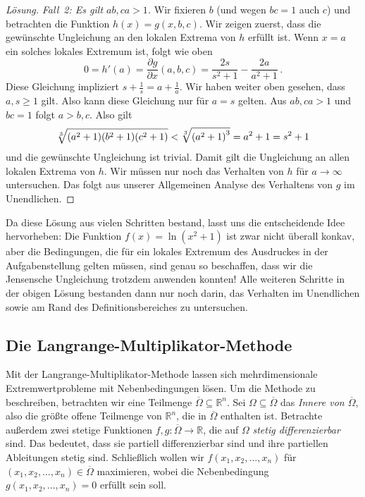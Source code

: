 \begin{proof}[Lösung]
	\emph{Fall~2: Es gilt $ab,ca>1$.} Wir fixieren $b$ (und wegen $bc=1$ auch $c$) und betrachten die Funktion $h(x)=g(x,b,c)$. Wir zeigen zuerst, dass die gewünschte Ungleichung an den lokalen Extrema von $h$ erfüllt ist. Wenn $x=a$ ein solches lokales Extremum ist, folgt wie oben
	\begin{equation*}
		0=h'(a)=\frac{\partial g}{\partial x}(a,b,c)=\frac{2s}{s^2+1}-\frac{2a}{a^2+1}\,.
	\end{equation*}
	Diese Gleichung impliziert $s+\frac1s=a+\frac1a$. Wir haben weiter oben gesehen, dass $a,s\geqslant 1$ gilt. Also kann diese Gleichung nur für $a=s$ gelten. Aus $ab,ca>1$ und $bc=1$ folgt $a>b,c$. Also gilt
	\begin{equation*}
		\sqrt[3]{\parens*{a^2+1}\parens*{b^2+1}\parens*{c^2+1}}<\sqrt[3]{\parens*{a^2+1}^3}=a^2+1=s^2+1
	\end{equation*}
	und die gewünschte Ungleichung ist trivial. Damit gilt die Ungleichung an allen lokalen Extrema von $h$. Wir müssen nur noch das Verhalten von $h$ für $a\rightarrow \infty$ untersuchen. Das folgt aus unserer Allgemeinen Analyse des Verhaltens von $g$ im Unendlichen.
\end{proof}

Da diese Lösung aus vielen Schritten bestand, lasst uns die entscheidende Idee hervorheben: Die Funktion $f(x)=\ln(x^2+1)$ ist zwar nicht überall konkav, aber die Bedingungen, die für ein lokales Extremum des Ausdruckes in der Aufgabenstellung gelten müssen, sind genau so beschaffen, dass wir die Jensensche Ungleichung trotzdem anwenden konnten! Alle weiteren Schritte in der obigen Lösung bestanden dann nur noch darin, das Verhalten im Unendlichen sowie am Rand des Definitionsbereiches zu untersuchen.

\subsection*{Die Langrange-Multiplikator-Methode}
Mit der Langrange-Multiplikator-Methode lassen sich mehrdimensionale Extremwertprobleme mit Nebenbedingungen lösen. Um die Methode zu beschreiben, betrachten wir eine Teilmenge $\overline{\Omega}\subseteq \mathbb R^n$. Sei $\Omega\subseteq \overline{\Omega}$ das \emph{Innere von $\overline{\Omega}$}, also die größte offene Teilmenge von $\mathbb R^n$, die in $\overline{\Omega}$ enthalten ist. Betrachte außerdem zwei stetige Funktionen $f,g\colon \overline{\Omega}\rightarrow \mathbb R$, die auf $\Omega$ \emph{stetig differenzierbar} sind. Das bedeutet, dass sie partiell differenzierbar sind und ihre partiellen Ableitungen stetig sind. Schließlich wollen wir $f(x_1,x_2,\dotsc,x_n)$ für $(x_1,x_2,\dotsc,x_n)\in\overline{\Omega}$ maximieren, wobei die Nebenbedingung $g(x_1,x_2,\dotsc,x_n)=0$ erfüllt sein soll.

